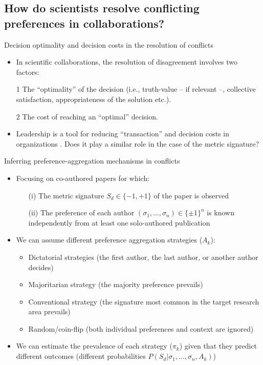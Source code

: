 \documentclass[10pt]{beamer}
\begin{document}
\subsection{How do scientists resolve conflicting preferences in collaborations?}

\begin{frame}{Decision optimality and decision costs in the resolution of conflicts}
    \begin{itemize}
        \item In scientific collaborations, the resolution of disagreement involves two factors:
        \item[1] The ``optimality'' of the decision (i.e., truth-value -- if relevant --, collective satisfaction, appropriateness of the solution etc.).
        \item[2] The cost of reaching an ``optimal'' decision.
        \item Leadership is a tool for reducing ``transaction'' and decision costs in organizations \citep{calvert1992leadership}. Does it play a similar role in the case of the metric signature?
    \end{itemize}
\end{frame}

\begin{frame}{Inferring preference-aggregation mechanisms in conflicts}
    \begin{itemize}
        \item Focusing on co-authored papers for which:
        \begin{enumerate}
            \item[(i)] The metric signature $S_d\in\{-1,+1\}$ of the paper is observed
            \item[(ii)] The preference of each author $(\sigma_1, \dots, \sigma_n)\in \{\pm 1\}^n$ is known independently from at least one solo-authored publication
        \end{enumerate}
        \item We can assume different preference aggregation strategies ($A_k$):
        \begin{itemize}
            \item Dictatorial strategies (the first author, the last author, or another author decides)
            \item Majoritarian strategy (the majority preference prevails)
            \item Conventional strategy (the signature most common in the target research area prevails)
            \item Random/coin-flip (both individual preferences and context are ignored)
        \end{itemize}
        \item We can estimate the prevalence of each strategy ($\pi_k$) given that they predict different outcomes (different probabilities  $P(S_d|\sigma_1,\dots,\sigma_n,A_k)$)
    \end{itemize}
\end{frame}
\end{document}
